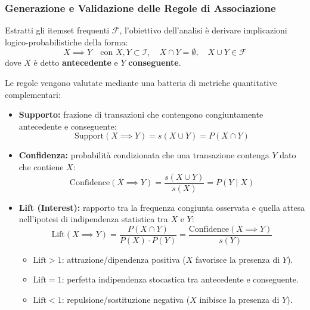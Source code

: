 \FloatBarrier
\subsubsection{Generazione e Validazione delle Regole di Associazione}
\label{subsec:lab-association-rules}

Estratti gli itemset frequenti $\mathcal{F}$, l'obiettivo dell'analisi è derivare implicazioni logico-probabilistiche della forma:
\begin{equation}
    X \implies Y \quad \text{con } X, Y \subset \mathcal{I}, \quad X \cap Y = \emptyset, \quad X \cup Y \in \mathcal{F}
\end{equation}
dove $X$ è detto \textbf{antecedente} e $Y$ \textbf{conseguente}.

\begin{definition}
Le regole vengono valutate mediante una batteria di metriche quantitative complementari:
\begin{itemize}
    \item \textbf{Supporto:} frazione di transazioni che contengono congiuntamente antecedente e conseguente:
    \begin{equation}
        \text{Support}(X \implies Y) = s(X \cup Y) = P(X \cap Y)
    \end{equation}
    \item \textbf{Confidenza:} probabilità condizionata che una transazione contenga $Y$ dato che contiene $X$:
    \begin{equation}
        \text{Confidence}(X \implies Y) = \frac{s(X \cup Y)}{s(X)} = P(Y \mid X)
    \end{equation}
    \item \textbf{Lift (Interest):} rapporto tra la frequenza congiunta osservata e quella attesa nell'ipotesi di indipendenza statistica tra $X$ e $Y$:
    \begin{equation}
        \text{Lift}(X \implies Y) = \frac{P(X \cap Y)}{P(X) \cdot P(Y)} = \frac{\text{Confidence}(X \implies Y)}{s(Y)}
    \end{equation}
    \begin{itemize}
        \item $\text{Lift} > 1$: attrazione/dipendenza positiva ($X$ favorisce la presenza di $Y$).
        \item $\text{Lift} = 1$: perfetta indipendenza stocastica tra antecedente e conseguente.
        \item $\text{Lift} < 1$: repulsione/sostituzione negativa ($X$ inibisce la presenza di $Y$).

\end{itemize}
\end{itemize}
\end{definition}
